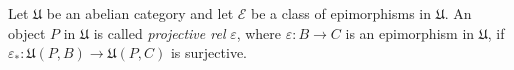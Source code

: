 Let $\mathfrak{U}$ be an abelian category and let $\mathcal{E}$ be a class of epimorphisms in $\mathfrak{U}$. An object $P$ in $\mathfrak{U}$ is called \textit{projective rel} $\varepsilon$, where $\varepsilon : B \to C$ is an epimorphism in $\mathfrak{U}$, if $\varepsilon_* : \mathfrak{U}(P, B) \to \mathfrak{U}(P, C)$ is surjective.